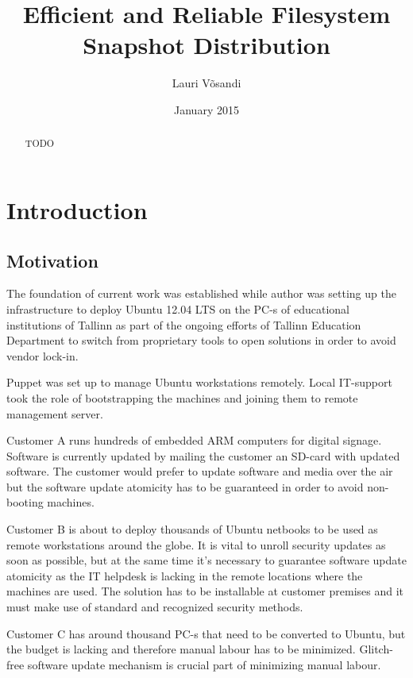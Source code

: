 \documentclass{article}
\title{Efficient and Reliable Filesystem Snapshot Distribution}
\author{Lauri Võsandi}
\date{January 2015}
\begin{document}
\maketitle


\begin{abstract}

TODO

\end{abstract}





\section{Introduction}


\subsection{Motivation}

The foundation of current work was established while author was setting up
the infrastructure to deploy Ubuntu 12.04 LTS on the PC-s of educational
institutions of Tallinn as part of the ongoing efforts of Tallinn Education
Department to switch from proprietary tools to open solutions
in order to avoid vendor lock-in.

Puppet was set up to manage Ubuntu workstations remotely. Local IT-support
took the role of bootstrapping the machines and joining them to remote
management server.

Customer A runs hundreds of embedded ARM computers for digital signage.
Software is currently updated by mailing the customer an SD-card with
updated software. The customer would prefer to update software and
media over the air but the software update atomicity has to be guaranteed
in order to avoid non-booting machines.

Customer B is about to deploy thousands of Ubuntu netbooks to be used as
remote workstations around the globe. It is vital to unroll security updates
as soon as possible, but at the same time it's necessary to guarantee
software update atomicity as the IT helpdesk is lacking in the remote
locations where the machines are used.
The solution has to be installable at customer premises and it
must make use of standard and recognized security methods.

Customer C has around thousand PC-s that need to be converted to Ubuntu,
but the budget is lacking and therefore manual labour has to be minimized.
Glitch-free software update mechanism is crucial part of minimizing manual
labour.
\end{document}
